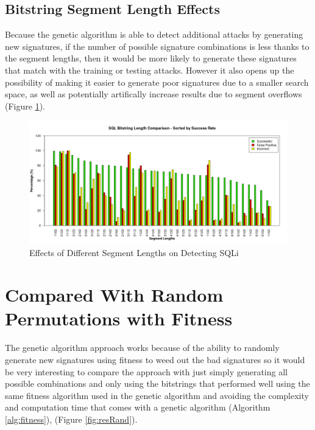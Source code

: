 \newpage
\subsection{Bitstring Segment Length Effects} \label{sec:resSegment}

Because the genetic algorithm is able to detect additional attacks by generating new signatures, if the number of possible signature combinations is less thanks to the segment lengths, then it would be more likely to generate these signatures that match with the training or testing attacks.  However it also opens up the possibility of making it easier to generate poor signatures due to a smaller search space, as well as potentially artifically increase results due to segment overflows (Figure \ref{fig:resLength}).

\begin{figure}[hb]
	\centering
	\includegraphics[width=450px]{./assets/results/ga/bitlength/Results_SuccessRate_SQL.png}
	\caption{Effects of Different Segment Lengths on Detecting SQLi}
	\label{fig:resLength}
\end{figure}

\newpage
\section{Compared With Random Permutations with Fitness} \label{sec:resRand}

The genetic algorithm approach works because of the ability to randomly generate new signatures using fitness to weed out the bad signatures so it would be very interesting to compare the approach with just simply generating all possible combinations and only using the bitstrings that performed well using the same fitness algorithm used in the genetic algorithm and avoiding the complexity and computation time that comes with a genetic algorithm (Algorithm \ref{alg:fitness}), (Figure \ref{fig:resRand}).

